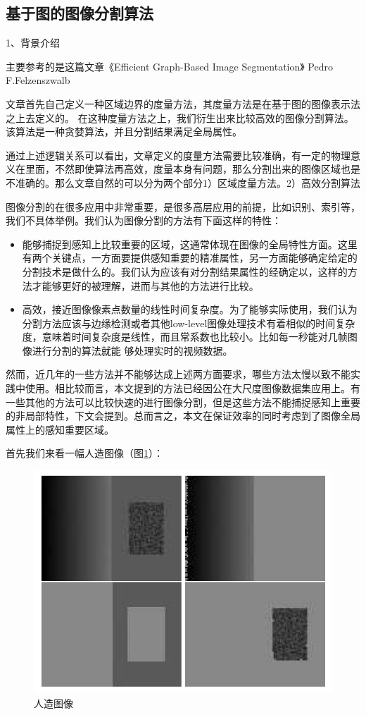 \subsection{基于图的图像分割算法}

1、背景介绍

主要参考的是这篇文章《Efficient Graph-Based Image Segmentation》 Pedro F.Felzenszwalb

文章首先自己定义一种区域边界的度量方法，其度量方法是在基于图的图像表示法之上去定义的。
在这种度量方法之上，我们衍生出来比较高效的图像分割算法。该算法是一种贪婪算法，并且分割结果满足全局属性。

通过上述逻辑关系可以看出，文章定义的度量方法需要比较准确，有一定的物理意义在里面，不然即使算法再高效，度量本身有问题，那么分割出来的图像区域也是不准确的。那么文章自然的可以分为两个部分1）区域度量方法。2）高效分割算法

图像分割的在很多应用中非常重要，是很多高层应用的前提，比如识别、索引等，我们不具体举例。我们认为图像分割的方法有下面这样的特性：
\begin{itemize}
\item 能够捕捉到感知上比较重要的区域，这通常体现在图像的全局特性方面。这里有两个关键点，一方面要提供感知重要的精准属性，另一方面能够确定给定的分割技术是做什么的。我们认为应该有对分割结果属性的经确定以，这样的方法才能够更好的被理解，进而与其他的方法进行比较。
\item 高效，接近图像像素点数量的线性时间复杂度。为了能够实际使用，我们认为分割方法应该与边缘检测或者其他low-level图像处理技术有着相似的时间复杂度，意味着时间复杂度是线性，而且常系数也比较小。比如每一秒能对几帧图像进行分割的算法就能
够处理实时的视频数据。
\end{itemize}

然而，近几年的一些方法并不能够达成上述两方面要求，哪些方法太慢以致不能实践中使用。相比较而言，本文提到的方法已经因公在大尺度图像数据集应用上。有一些其他的方法可以比较快速的进行图像分割，但是这些方法不能捕捉感知上重要的非局部特性，下文会提到。总而言之，本文在保证效率的同时考虑到了图像全局属性上的感知重要区域。

首先我们来看一幅人造图像（图\ref{fig:man_made}）：
\begin{figure}
\centering\includegraphics[width=15cm]{imgs/ch2/man_made}
\caption{人造图像}
\label{fig:man_made}
\end{figure}

